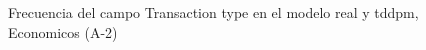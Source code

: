 \begin{figure}[H]
    \centering
    
    \caption{Frecuencia del campo Transaction type en el modelo real y tddpm, Economicos (A-2)}
    \label{frecuency-Transaction Type-tddpm_mlp}
\end{figure}